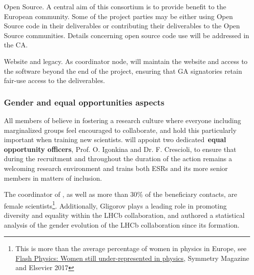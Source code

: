 \noindent \color{blue}Open Source. \color{black} 
A central aim of this consortium is to provide benefit to the European community. Some of the project parties may be either using Open Source code in their deliverables or contributing their deliverables to the Open Source communities. Details concerning open source code use will be addressed in the CA.

\noindent \color{blue}Website and legacy. \color{black} 
As coordinator node, \lund will maintain the \acronym website and access to the software beyond the end of the project, ensuring that GA signatories retain fair-use access to the deliverables.



\vspace{-2mm}
\subsubsection{Gender and equal opportunities aspects}
\label{sub:genderEO}

All members of \acronym believe in fostering a research culture where everyone including
marginalized groups feel encouraged to collaborate, and hold this particularly important when training new scientists. \acronym will appoint two dedicated~\textbf{equal opportunity officers}, Prof. O. Igonkina and Dr. F. Crescioli, to ensure that during the recruitment and throughout the duration of the action \acronym remains a welcoming research environment and trains both ESRs and its more senior members in matters of inclusion. 

The coordinator of \acronym, as well as more than $30\%$ of the beneficiary contacts,
are female scientists\footnote{This is more than the average percentage of women in physics in Europe, see \href{http://physicsworld.com/cws/article/news/2017/mar/09/flash-physics-women-still-under-represented-in-physics-paint-drying-mystery-solved-ligo-s-ronald-drever-dies}{Flash Physics: Women still under-represented in physics}, Symmetry Magazine and Elsevier 2017}. 
Additionally, Gligorov plays a leading role in
promoting diversity and equality within the LHCb collaboration, 
and authored a statistical analysis of the gender evolution of the
LHCb collaboration since its formation. 

